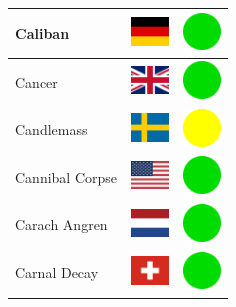 \documentclass[12pt, a4paper, twoside]{report}
\begin{document}
\begin{center}
\begin{longtable}{|p{5cm}|p{2cm}|p{2cm}|}
Caliban & \includegraphics[width=1cm]{4x3/de} & \includegraphics[width=1cm]{likes/y} \\ \hline
Cancer & \includegraphics[width=1cm]{4x3/gb} & \includegraphics[width=1cm]{likes/y} \\ \hline
Candlemass & \includegraphics[width=1cm]{4x3/se} & \includegraphics[width=1cm]{likes/m} \\ \hline
Cannibal Corpse & \includegraphics[width=1cm]{4x3/us} & \includegraphics[width=1cm]{likes/y} \\ \hline
Carach Angren & \includegraphics[width=1cm]{4x3/nl} & \includegraphics[width=1cm]{likes/y} \\ \hline
Carnal Decay & \includegraphics[width=1cm]{4x3/ch} & \includegraphics[width=1cm]{likes/y} \\ \hline

\end{longtable}
\end{center}
\end{document}

